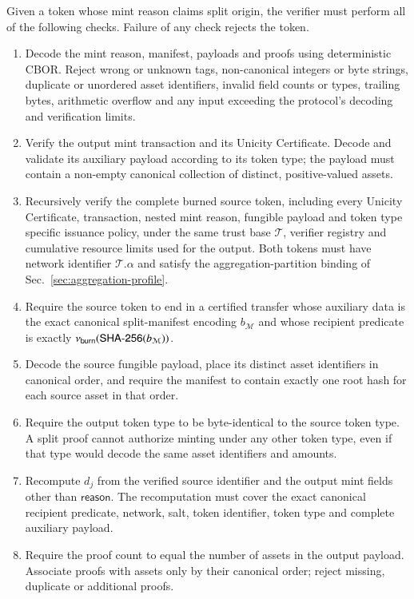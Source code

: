 Given a token whose mint reason claims split origin, the verifier must perform all of the following checks.  Failure of any check rejects the token.
\begin{enumerate}
	\item Decode the mint reason, manifest, payloads and proofs using deterministic CBOR.  Reject wrong or unknown tags, non-canonical integers or byte strings, duplicate or unordered asset identifiers, invalid field counts or types, trailing bytes, arithmetic overflow and any input exceeding the protocol's decoding and verification limits.
	\item Verify the output mint transaction and its Unicity Certificate.  Decode and validate its auxiliary payload according to its token type; the payload must contain a non-empty canonical collection of distinct, positive-valued assets.
	\item Recursively verify the complete burned source token, including every Unicity Certificate, transaction, nested mint reason, fungible payload and token type specific issuance policy, under the same trust base $\mathcal{T}$, verifier registry and cumulative resource limits used for the output.  Both tokens must have network identifier $\mathcal{T}.\alpha$ and satisfy the aggregation-partition binding of Sec.~\ref{sec:aggregation-profile}.
	\item Require the source token to end in a certified transfer whose auxiliary data is the exact canonical split-manifest encoding $b_\mathcal{M}$ and whose recipient predicate is exactly $\nu_\mathsf{burn}(\mathsf{SHA\text{-}256}(b_\mathcal{M}))$.
	\item Decode the source fungible payload, place its distinct asset identifiers in canonical order, and require the manifest to contain exactly one root hash for each source asset in that order.
	\item Require the output token type to be byte-identical to the source token type.  A split proof cannot authorize minting under any other token type, even if that type would decode the same asset identifiers and amounts.
	\item Recompute $d_j$ from the verified source identifier and the output mint fields other than $\mathsf{reason}$.  The recomputation must cover the exact canonical recipient predicate, network, salt, token identifier, token type and complete auxiliary payload.
	\item Require the proof count to equal the number of assets in the output payload.  Associate proofs with assets only by their canonical order; reject missing, duplicate or additional proofs.

\end{enumerate}
